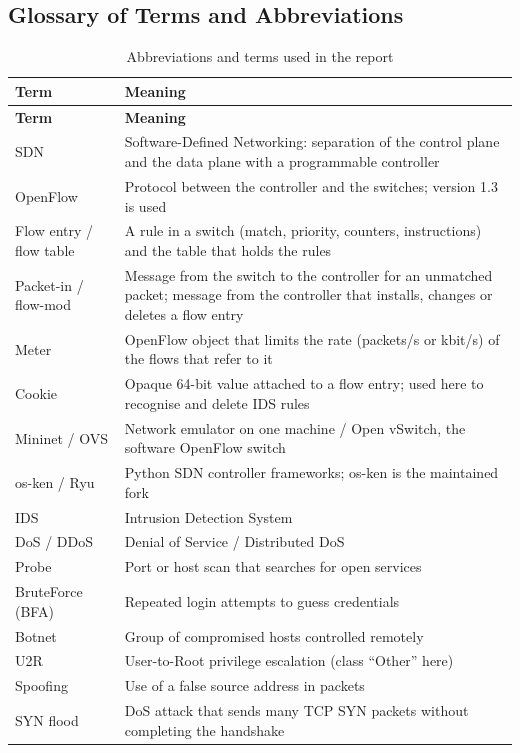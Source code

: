 \begin{appendices}
\chapter{Glossary of Terms and Abbreviations}
\begin{longtable}{|p{3.2cm}|p{10.8cm}|}
\caption{Abbreviations and terms used in the report}\label{tab:glossary}\\
\hline \textbf{Term} & \textbf{Meaning} \\ \hline \endfirsthead
\hline \textbf{Term} & \textbf{Meaning} \\ \hline \endhead
SDN & Software-Defined Networking: separation of the control plane and the data plane with a programmable controller \\ \hline
OpenFlow & Protocol between the controller and the switches; version 1.3 is used \\ \hline
Flow entry / flow table & A rule in a switch (match, priority, counters, instructions) and the table that holds the rules \\ \hline
Packet-in / flow-mod & Message from the switch to the controller for an unmatched packet; message from the controller that installs, changes or deletes a flow entry \\ \hline
Meter & OpenFlow object that limits the rate (packets/s or kbit/s) of the flows that refer to it \\ \hline
Cookie & Opaque 64-bit value attached to a flow entry; used here to recognise and delete IDS rules \\ \hline
Mininet / OVS & Network emulator on one machine / Open vSwitch, the software OpenFlow switch \\ \hline
os-ken / Ryu & Python SDN controller frameworks; os-ken is the maintained fork \\ \hline
IDS & Intrusion Detection System \\ \hline
DoS / DDoS & Denial of Service / Distributed DoS \\ \hline
Probe & Port or host scan that searches for open services \\ \hline
BruteForce (BFA) & Repeated login attempts to guess credentials \\ \hline
Botnet & Group of compromised hosts controlled remotely \\ \hline
U2R & User-to-Root privilege escalation (class ``Other'' here) \\ \hline
Spoofing & Use of a false source address in packets \\ \hline
SYN flood & DoS attack that sends many TCP SYN packets without completing the handshake \\ \hline

\end{longtable}
\end{appendices}
